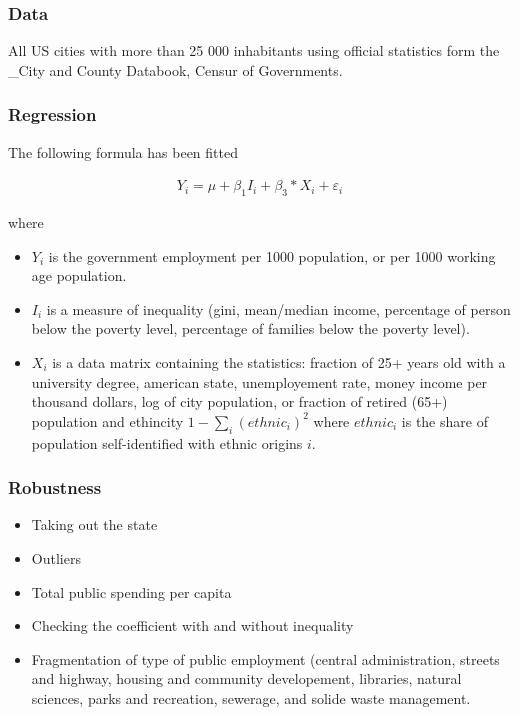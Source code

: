 \subsubsection{Data}\label{data}

All US cities with more than 25 000 inhabitants using official
statistics form the \_City and County Databook, Censur of Governments.

\subsubsection{Regression}\label{regression}

The following formula has been fitted

\begin{align*}
    Y_{i} = \mu + \beta_1 I_i + \beta_3 * X_i + \varepsilon_i
\end{align*}

where

\begin{itemize}
\itemsep1pt\parskip0pt
\item
  \(Y_i\) is the government employment per 1000 population, or per 1000
  working age population.
\item
  \(I_i\) is a measure of inequality (gini, mean/median income,
  percentage of person below the poverty level, percentage of families
  below the poverty level).
\item
  \(X_i\) is a data matrix containing the statistics: fraction of 25+
  years old with a university degree, american state, unemployement
  rate, money income per thousand dollars, log of city population, or
  fraction of retired (65+) population and ethincity
  \(1 - \sum_i (ethnic_i)^2\) where \(ethnic_i\) is the share of
  population self-identified with ethnic origins \(i\).
\end{itemize}

\subsubsection{Robustness}\label{robustness}

\begin{itemize}
\itemsep1pt\parskip0pt
\item
  Taking out the state
\item
  Outliers
\item
  Total public spending per capita
\item
  Checking the coefficient with and without inequality
\item
  Fragmentation of type of public employment (central administration,
  streets and highway, housing and community developement, libraries,
  natural sciences, parks and recreation, sewerage, and solide waste
  management.
\end{itemize}

